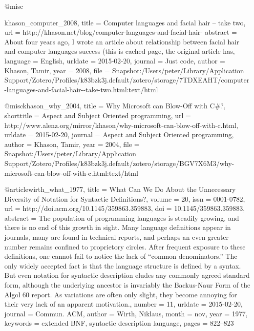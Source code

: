 @misc{khason_computer_2008,
	title = {Computer languages and facial hair -- take two},
	url = {http://khason.net/blog/computer-languages-and-facial-hair-%
	abstract = {About four years ago, I wrote an article about relationship between facial hair and computer languages success (this is cached page, the original article has},
	language = {English},
	urldate = {2015-02-20},
	journal = {Just code},
	author = {Khason, Tamir},
	year = {2008},
	file = {Snapshot:/Users/peter/Library/Application Support/Zotero/Profiles/k83bzk3j.default/zotero/storage/7TDXEAHT/computer-languages-and-facial-hair-{\textendash}-take-two.html:text/html}
}

@misc{khason_why_2004,
	title = {Why {Microsoft} can {Blow}-{Off} with {C}\#?},
	shorttitle = {Aspect and {Subject} {Oriented} programming},
	url = {http://www.alenz.org/mirror/khason/why-microsoft-can-blow-off-with-c.html},
	urldate = {2015-02-20},
	journal = {Aspect and Subject Oriented programming},
	author = {Khason, Tamir},
	year = {2004},
	file = {Snapshot:/Users/peter/Library/Application Support/Zotero/Profiles/k83bzk3j.default/zotero/storage/BGV7X6M3/why-microsoft-can-blow-off-with-c.html:text/html}
}

@article{wirth_what_1977,
	title = {What {Can} {We} {Do} {About} the {Unnecessary} {Diversity} of {Notation} for {Syntactic} {Definitions}?},
	volume = {20},
	issn = {0001-0782},
	url = {http://doi.acm.org/10.1145/359863.359883},
	doi = {10.1145/359863.359883},
	abstract = {The population of programming languages is steadily growing, and there is no end of this growth in sight. Many language definitions appear in journals, many are found in technical reports, and perhaps an even greater number remains confined to proprietory circles. After frequent exposure to these definitions, one cannot fail to notice the lack of {\textquotedblleft}common denominators.{\textquotedblright} The only widely accepted fact is that the language structure is defined by a syntax. But even notation for syntactic description eludes any commonly agreed standard form, although the underlying ancestor is invariably the Backus-Naur Form of the Algol 60 report. As variations are often only slight, they become annoying for their very lack of an apparent motivation.},
	number = {11},
	urldate = {2015-02-20},
	journal = {Commun. ACM},
	author = {Wirth, Niklaus},
	month = nov,
	year = {1977},
	keywords = {extended BNF, syntactic description language},
	pages = {822--823}
}

}
